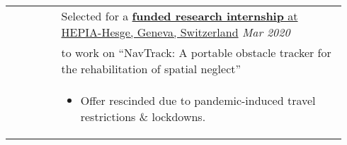 \documentclass[letterpaper, 10pt, oneside]{article}
\begin{document}
\begin{longtable}{@{} p{0.14\linewidth} p{0.8\linewidth}}
                         & Selected for a \href{https://drive.google.com/file/d/1Rtlu6aHQKXntWhfEUcgB5tuNYMuvH04b}{\textbf{funded research internship} at HEPIA-Hesge, Geneva, Switzerland} \hfill \textsl{Mar 2020}                         \\
                         & to work on ``NavTrack: A portable obstacle tracker for the rehabilitation of spatial neglect''                                                                                                                    \\
                         & \parbox{0.8\textwidth}{                                                                                                                                                                                           %
        \begin{itemize}[leftmargin=6ex, itemsep=-0.88ex, topsep=-0.88ex]
            \item Offer rescinded due to pandemic-induced travel restrictions \& lockdowns. \\
        \end{itemize}
    }
    \\
\end{longtable}
\end{document}
